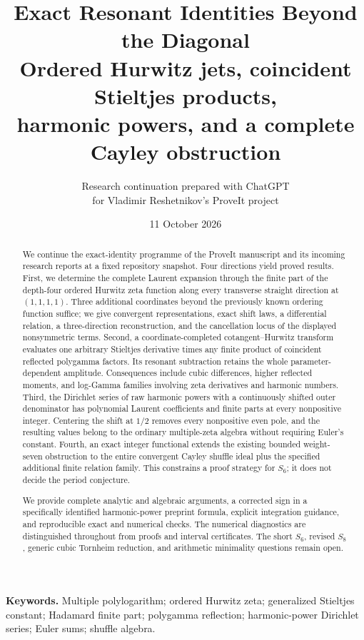 \documentclass[11pt,a4paper]{article}
\title{\textbf{Exact Resonant Identities Beyond the Diagonal}\\[5pt]
 \large Ordered Hurwitz jets, coincident Stieltjes products,\\
 harmonic powers, and a complete Cayley obstruction}
\author{Research continuation prepared with ChatGPT\\
 for Vladimir Reshetnikov's ProveIt project}
\date{11 October 2026}
\numberwithin{equation}{section}
\theoremstyle{definition}
\theoremstyle{remark}
\begin{document}
\maketitle

\begin{abstract}
We continue the exact-identity programme of the ProveIt manuscript and
its incoming research reports at a fixed repository snapshot. Four
directions yield proved results. First, we determine the complete
Laurent expansion through the finite part of the depth-four ordered
Hurwitz zeta function along every transverse straight direction at
$(1,1,1,1)$. Three additional coordinates beyond the previously known
ordering function suffice; we give convergent representations, exact
shift laws, a differential relation, a three-direction reconstruction,
and the cancellation locus of the displayed nonsymmetric terms.
Second, a coordinate-completed cotangent--Hurwitz transform evaluates
one arbitrary Stieltjes derivative times any finite product of
coincident reflected polygamma factors. Its resonant subtraction retains
the whole parameter-dependent amplitude. Consequences include cubic
differences, higher reflected moments, and log-Gamma families involving
zeta derivatives and harmonic numbers. Third, the Dirichlet series of
raw harmonic powers with a continuously shifted outer denominator has
polynomial Laurent coefficients and finite parts at every nonpositive
integer. Centering the shift at $1/2$ removes every nonpositive even
pole, and the resulting values belong to the ordinary multiple-zeta
algebra without requiring Euler's constant. Fourth, an exact integer
functional extends the existing bounded weight-seven obstruction to
the entire convergent Cayley shuffle ideal plus the specified additional
finite relation family. This constrains a proof strategy for $S_6$;
it does not decide the period conjecture.

We provide complete analytic and algebraic arguments, a corrected sign
in a specifically identified harmonic-power preprint formula, explicit
integration guidance, and reproducible exact and numerical checks.
The numerical diagnostics are distinguished throughout from proofs and
interval certificates. The short $S_6$, revised $S_8$, generic cubic
Tornheim reduction, and arithmetic minimality questions remain open.
\end{abstract}
\noindent\textbf{Keywords.} Multiple polylogarithm; ordered Hurwitz zeta;
generalized Stieltjes constant; Hadamard finite part; polygamma reflection;
harmonic-power Dirichlet series; Euler sums; shuffle algebra.
\end{document}
